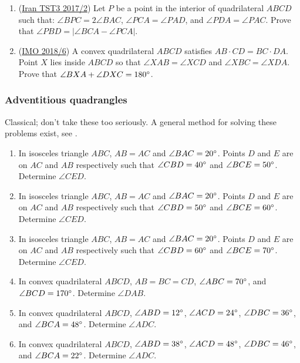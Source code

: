 \documentclass[11pt,paper=letter]{scrartcl}
\begin{document}
\begin{enumerate}
  \item (\href{https://aops.com/community/c6h1437519}{Iran TST3 2017/2}) Let $P$ be a point in the interior of quadrilateral $ABCD$ such that: $\angle BPC = 2\angle BAC$, $\angle PCA = \angle PAD$, and $\angle PDA = \angle PAC$. Prove that $\angle PBD = |\angle BCA - \angle PCA|$.

  \item (\href{https://aops.com/community/c6h1671293}{IMO 2018/6}) A convex quadrilateral $ABCD$ satisfies $AB\cdot CD = BC\cdot DA$. Point $X$ lies inside $ABCD$ so that $\angle{XAB} = \angle{XCD}$ and $\angle XBC = \angle XDA$. Prove that $\angle{BXA} + \angle{DXC} = 180^\circ$.
\end{enumerate}

\subsubsection*{Adventitious quadrangles}

Classical; don't take these too seriously. A general method for solving these problems exist, see \cite{B}.

\begin{enumerate}
  \item In isosceles triangle $ABC$, $AB = AC$ and $\angle BAC = 20^\circ$. Points $D$ and $E$ are on $AC$ and $AB$ respectively such that $\angle CBD = 40^\circ$ and $\angle BCE = 50^\circ$. Determine $\angle CED$.

  \item In isosceles triangle $ABC$, $AB = AC$ and $\angle BAC = 20^\circ$. Points $D$ and $E$ are on $AC$ and $AB$ respectively such that $\angle CBD = 50^\circ$ and $\angle BCE = 60^\circ$. Determine $\angle CED$.

  \item In isosceles triangle $ABC$, $AB = AC$ and $\angle BAC = 20^\circ$. Points $D$ and $E$ are on $AC$ and $AB$ respectively such that $\angle CBD = 60^\circ$ and $\angle BCE = 70^\circ$. Determine $\angle CED$.

  \item In convex quadrilateral $ABCD$, $AB = BC = CD$, $\angle ABC = 70^\circ$, and $\angle BCD = 170^\circ$. Determine $\angle DAB$.

  \item In convex quadrilateral $ABCD$, $\angle ABD = 12^\circ$, $\angle ACD = 24^\circ$, $\angle DBC = 36^\circ$, and $\angle BCA = 48^\circ$. Determine $\angle ADC$.

  \item In convex quadrilateral $ABCD$, $\angle ABD = 38^\circ$, $\angle ACD = 48^\circ$, $\angle DBC = 46^\circ$, and $\angle BCA = 22^\circ$. Determine $\angle ADC$.
\end{enumerate}
\end{document}
